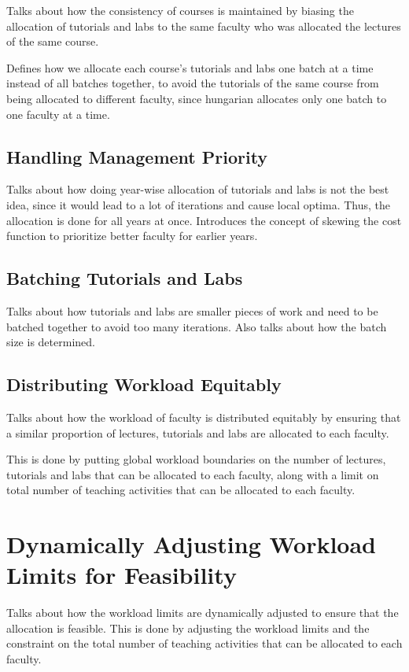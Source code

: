 Talks about how the consistency of courses is maintained by biasing the allocation of tutorials and labs to the same faculty who was allocated the lectures of the same course.

Defines how we allocate each course's tutorials and labs one batch at a time instead of all batches together, to avoid the tutorials of the same course from being allocated to different faculty, since hungarian allocates only one batch to one faculty at a time.

\subsection{Handling Management Priority}

Talks about how doing year-wise allocation of tutorials and labs is not the best idea, since it would lead to a lot of iterations and cause local optima. Thus, the allocation is done for all years at once. Introduces the concept of skewing the cost function to prioritize better faculty for earlier years.

\subsection{Batching Tutorials and Labs}

Talks about how tutorials and labs are smaller pieces of work and need to be batched together to avoid too many iterations. Also talks about how the batch size is determined.


\subsection{Distributing Workload Equitably}

Talks about how the workload of faculty is distributed equitably by ensuring that a similar proportion of lectures, tutorials and labs are allocated to each faculty.

This is done by putting global workload boundaries on the number of lectures, tutorials and labs that can be allocated to each faculty, along with a limit on total number of teaching activities that can be allocated to each faculty.

\section{Dynamically Adjusting Workload Limits for Feasibility}

Talks about how the workload limits are dynamically adjusted to ensure that the allocation is feasible. This is done by adjusting the workload limits and the constraint on the total number of teaching activities that can be allocated to each faculty.

